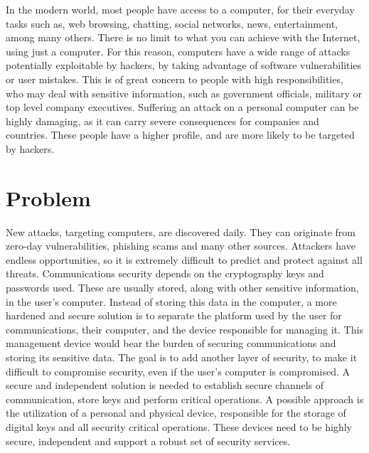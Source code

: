 \cleardoublepage
\label{chap:intro}

In the modern world, most people have access to a computer, for their everyday tasks such as, web browsing, chatting, social networks, news, entertainment, among many others.
There is no limit to what you can achieve with the Internet, using just a computer.
For this reason, computers have a wide range of attacks potentially exploitable by hackers, by taking advantage of software vulnerabilities or user mistakes.
This is of great concern to people with high responsibilities, who may deal with sensitive information, such as government officials, military or top level company executives.
Suffering an attack on a personal computer can be highly damaging, as it can carry severe consequences for companies and countries.
These people have a higher profile, and are more likely to be targeted by hackers.

\section{Problem}\label{chap:intro:problem}

New attacks, targeting computers, are discovered daily.
They can originate from zero-day vulnerabilities, phishing scams and many other sources. Attackers have endless opportunities, so it is extremely difficult to predict and protect against all threats.
Communications security depends on the cryptography keys and passwords used. These are usually stored, along with other sensitive information, in the user's computer.
Instead of storing this data in the computer, a more hardened and secure solution is to separate the platform used by the user for communications, their computer, and the device responsible for managing it. This management device would bear the burden of securing communications and storing its sensitive data.
The goal is to add another layer of security, to make it difficult to compromise security, even if the user's computer is compromised.
A secure and independent solution is needed to establish secure channels of communication, store keys and perform critical operations.%
A possible approach is the utilization of a personal and physical device, responsible for the storage of digital keys and all security critical operations.
These devices need to be highly secure, independent and support a robust set of security services. %

